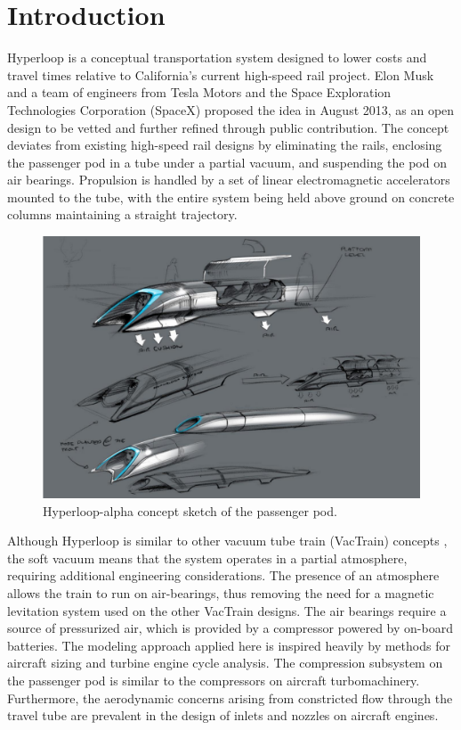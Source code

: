 \documentclass[heading.tex]{subfiles}
\begin{document}
\section{Introduction}

Hyperloop is a conceptual transportation system designed to lower costs and travel times relative to California's current high-speed rail project.
\cite{Musk} Elon Musk and a team of engineers from Tesla Motors and the Space Exploration Technologies Corporation (SpaceX)
proposed the idea in August 2013, as an open design to be vetted and further refined through public contribution.
The concept deviates from existing high-speed rail designs by eliminating the rails, enclosing the passenger pod in a 
tube under a partial vacuum, and suspending the pod on air bearings. Propulsion is handled by a set of linear 
electromagnetic accelerators mounted to the tube, with the entire system being held above ground on concrete 
columns maintaining a straight trajectory.

\begin{figure}[hbtp]
\centering
\includegraphics[width=.75\textwidth]{images/hyperloopAlphaSketch.png}
 \caption[Hyperloop Concept Sketch]{Hyperloop-alpha concept sketch of the passenger pod. \cite{Musk}}
\label{f:hyperloopSketch}
\end{figure}

Although Hyperloop is similar to other vacuum tube train (VacTrain) concepts \cite{ET3},
the soft vacuum means that the system operates in a partial atmosphere, requiring additional engineering considerations.
The presence of an atmosphere allows the train to run on air-bearings,
thus removing the need for a magnetic levitation system used on the other VacTrain designs.
The air bearings require a source of pressurized air, which is provided by a compressor powered by on-board batteries. 
The modeling approach applied here is inspired heavily by methods for aircraft sizing and turbine engine cycle analysis. 
The compression subsystem on the passenger pod is similar to the compressors on aircraft turbomachinery. Furthermore, the aerodynamic concerns  
arising from constricted flow through the travel tube are prevalent in the design of inlets and nozzles on aircraft engines. 
\end{document}

